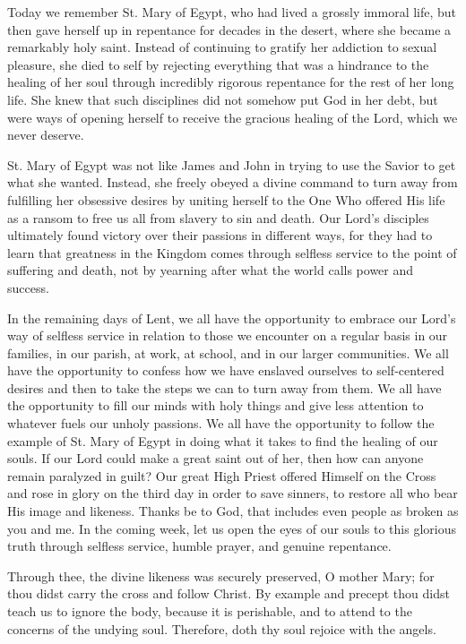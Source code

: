 \documentclass[twoside, letterpaper, 12pt]{report}
\begin{document}
\begin{maybetwocolumns}
Today we remember St. Mary of Egypt, who had lived a grossly immoral life,
but then gave herself up in repentance for decades in the desert,
where she became a remarkably holy saint. Instead of continuing to gratify her addiction
to sexual pleasure, she died to self by rejecting everything that was a hindrance to the
healing of her soul through incredibly rigorous repentance for the rest of her long life.
She knew that such disciplines did not somehow put God in her debt,
but were ways of opening herself to receive the gracious healing of the Lord,
which we never deserve.

St. Mary of Egypt was not like James and John in trying to use the Savior to get what she wanted.
Instead, she freely obeyed a divine command to turn away from fulfilling her obsessive desires by
uniting herself to the One Who offered His life as a ransom to free us all from slavery to sin
and death. Our Lord’s disciples ultimately found victory over their passions in different ways,
for they had to learn that greatness in the Kingdom comes through selfless service to the point of
suffering and death, not by yearning after what the world calls power and success.

In the remaining days of Lent, we all have the opportunity to embrace our Lord’s way of selfless
service in relation to those we encounter on a regular basis in our families, in our parish,
at work, at school, and in our larger communities.
We all have the opportunity to confess how we have enslaved ourselves to self-centered desires
and then to take the steps we can to turn away from them. 
We all have the opportunity to fill our minds with holy things and give less attention to whatever
fuels our unholy passions.
We all have the opportunity to follow the example of St. Mary of Egypt in doing what it takes to
find the healing of our souls. If our Lord could make a great saint out of her,
then how can anyone remain paralyzed in guilt? Our great High Priest offered Himself on the Cross
and rose in glory on the third day in order to save sinners,
to restore all who bear His image and likeness.
Thanks be to God, that includes even people as broken as you and me.
In the coming week, let us open the eyes of our souls to this glorious truth through selfless
service, humble prayer, and genuine repentance.

\end{maybetwocolumns}



Through thee, the divine likeness was securely preserved, O mother Mary;
for thou didst carry the cross and follow Christ.
By example and precept thou didst teach us to ignore the body, because it is perishable,
and to attend to the concerns of the undying soul.
Therefore, doth thy soul rejoice with the angels.

\readerline{\throughtheprayers}

\end{document}

